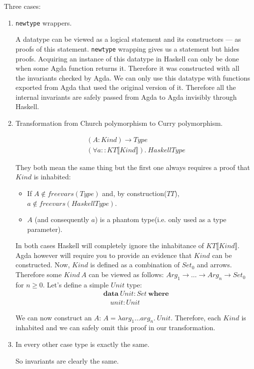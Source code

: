 Three cases:
\begin{enumerate}
\item \texttt{newtype} wrappers.

A datatype can be viewed as a logical statement and its constructors --- as
proofs of this statement. \texttt{newtype} wrapping gives us a statement but
hides proofs. Acquiring an instance of this datatype in Haskell can only be done
when some Agda function returns it. Therefore it was constructed with all the invariants
checked by Agda. We can only use this datatype with functions exported from Agda that
used the original version of it. Therefore all the internal invariants are safely passed
from Agda to Agda invisibly through Haskell.

\item Transformation from Church polymorphism to Curry polymorphism.

\begin{align*}
&(A : Kind) \rightarrow Type \\
&(\forall a :: KT\llbracket Kind \rrbracket).\ HaskellType
\end{align*}

They both mean the same thing but the first one always requires a proof that
\(Kind\) is inhabited:

\begin{itemize}
\item If \(A \not\in freevars(Type)\) and, by construction(\(TT\)), \(a \not\in freevars(HaskellType)\).
\item \(A\) (and consequently \(a\)) is a phantom type(i.e. only used as a type parameter).
\end{itemize}

In both cases Haskell will completely ignore the inhabitance of \(KT\llbracket Kind \rrbracket\).
Agda however will require you to provide an evidence that \(Kind\) can be constructed. Now,
\(Kind\) is defined as a combination of \(Set_0\) and arrows. Therefore some \(Kind\ A\) can be viewed as
follows: \(Arg_1 \rightarrow \ldots \rightarrow Arg_n \rightarrow Set_0\) for \(n \ge 0\).
Let's define a simple \(Unit\) type:
\begin{align*}
   &\mathbf{data}\ Unit : Set\ \mathbf{where}\\
   &\quad unit : Unit
\end{align*}

We can now construct an \(A\): \(A = \lambda arg_1 \ldots arg_n.\ Unit\). Therefore, each \(Kind\)
is inhabited and we can safely omit this proof in our transformation.

\item In every other case type is exactly the same.

So invariants are clearly the same.
\end{enumerate}


